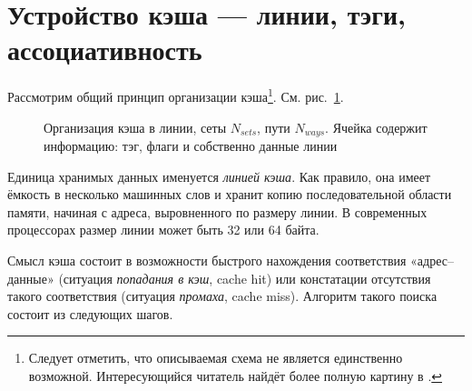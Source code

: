 \section{Устройство кэша --- линии, тэги, ассоциативность}

Рассмотрим общий принцип организации кэша\footnote{Следует отметить, что описываемая схема не является единственно возможной. Интересующийся читатель найдёт более полную картину в \cite{hennessy-patterson}.}. См. рис.~\ref{fig:cache}.

\begin{figure}[htb]
    \centering
    \caption[Организация кэша в линии, сеты, пути]{Организация кэша в линии, сеты $N_{sets}$, пути $N_{ways}$. Ячейка содержит информацию: тэг, флаги и собственно данные линии}
    \label{fig:cache}
\end{figure}


Единица хранимых данных именуется \textit{линией кэша}. Как правило, она имеет ёмкость в несколько машинных слов и хранит копию последовательной области памяти, начиная с адреса, выровненного по размеру линии. В современных процессорах размер линии может быть 32 или 64 байта. 

Смысл кэша состоит в возможности быстрого нахождения соответствия «адрес--данные» (ситуация \textit{попадания в кэш}, \abbr cache hit) или констатации отсутствия такого соответствия (ситуация \textit{промаха}, \abbr cache miss). Алгоритм такого поиска состоит из следующих шагов.

